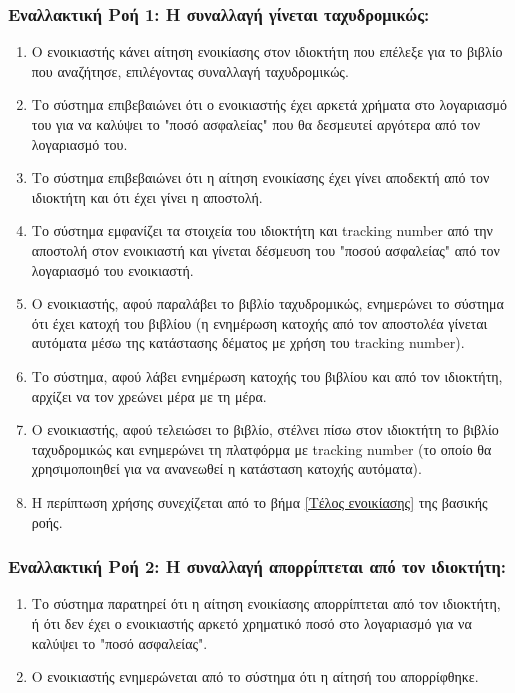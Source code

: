 \documentclass[12pt,a4paper]{article}
\begin{document}
\subsubsection*{Εναλλακτική Ροή 1: Η συναλλαγή γίνεται ταχυδρομικώς:}
\begin{enumerate}
    \item[\ref{Επιλογή τρόπου συναλλαγής}.1.] Ο ενοικιαστής κάνει αίτηση ενοικίασης στον ιδιοκτήτη που επέλεξε για το βιβλίο που αναζήτησε, επιλέγοντας συναλλαγή ταχυδρομικώς.
    \item[\ref{Επιλογή τρόπου συναλλαγής}.2.] Το σύστημα επιβεβαιώνει ότι ο ενοικιαστής έχει αρκετά χρήματα στο λογαριασμό του για να καλύψει το "ποσό ασφαλείας" που θα δεσμευτεί αργότερα από τον λογαριασμό του.
    \item[\ref{Επιλογή τρόπου συναλλαγής}.3.] Το σύστημα επιβεβαιώνει ότι η αίτηση ενοικίασης έχει γίνει αποδεκτή από τον ιδιοκτήτη και ότι έχει γίνει η αποστολή.
    \item[\ref{Επιλογή τρόπου συναλλαγής}.4.] Το σύστημα εμφανίζει τα στοιχεία του ιδιοκτήτη και tracking number από την αποστολή στον ενοικιαστή και γίνεται δέσμευση του "ποσού ασφαλείας" από τον λογαριασμό του ενοικιαστή.
    \item[\ref{Επιλογή τρόπου συναλλαγής}.5.] Ο ενοικιαστής, αφού παραλάβει το βιβλίο ταχυδρομικώς, ενημερώνει το σύστημα ότι έχει κατοχή του βιβλίου (η ενημέρωση κατοχής από τον αποστολέα γίνεται αυτόματα μέσω της κατάστασης δέματος με χρήση του tracking number).
    \item[\ref{Επιλογή τρόπου συναλλαγής}.6.] Το σύστημα, αφού λάβει ενημέρωση κατοχής του βιβλίου και από τον ιδιοκτήτη, αρχίζει να τον χρεώνει μέρα με τη μέρα.
    \item[\ref{Επιλογή τρόπου συναλλαγής}.7.] Ο ενοικιαστής, αφού τελειώσει το βιβλίο, στέλνει πίσω στον ιδιοκτήτη το βιβλίο ταχυδρομικώς και ενημερώνει τη πλατφόρμα με tracking number (το οποίο θα χρησιμοποιηθεί για να ανανεωθεί η κατάσταση κατοχής αυτόματα).
    \item[\ref{Επιλογή τρόπου συναλλαγής}.9.] Η περίπτωση χρήσης συνεχίζεται από το βήμα \ref{Τέλος ενοικίασης} της βασικής ροής.
\end{enumerate}

\subsubsection*{Εναλλακτική Ροή 2: Η συναλλαγή απορρίπτεται από τον ιδιοκτήτη:}
\begin{enumerate}
    \item[\ref{Έλεγχος ποσού ασφαλείας}\|\ref{Αποδοχή ή απόρριψη συναλλαγής}.1, \ref{Επιλογή τρόπου συναλλαγής}.2\|3.1.] Το σύστημα παρατηρεί ότι η αίτηση ενοικίασης απορρίπτεται από τον ιδιοκτήτη, ή ότι δεν έχει ο ενοικιαστής αρκετό χρηματικό ποσό στο λογαριασμό για να καλύψει το "ποσό ασφαλείας".
    \item[\ref{Έλεγχος ποσού ασφαλείας}\|\ref{Αποδοχή ή απόρριψη συναλλαγής}.2, \ref{Επιλογή τρόπου συναλλαγής}.2\|3.2.] Ο ενοικιαστής ενημερώνεται από το σύστημα ότι η αίτησή του απορρίφθηκε.
\end{enumerate}
\end{document}
